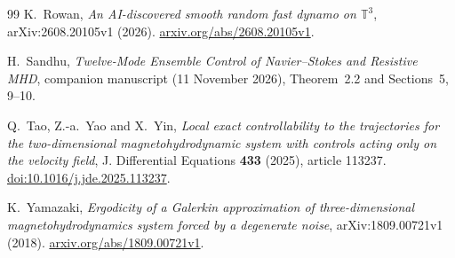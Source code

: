\documentclass[11pt,a4paper]{amsart}
\theoremstyle{definition}
\theoremstyle{remark}
\numberwithin{equation}{section}
\newcommand{\T}{\mathbb T}
\begin{document}
\begin{thebibliography}{99}
K.~Rowan,
\emph{An AI-discovered smooth random fast dynamo on $\T^3$},
arXiv:2608.20105v1 (2026).
\href{https://arxiv.org/abs/2608.20105v1}{arxiv.org/abs/2608.20105v1}.

H.~Sandhu,
\emph{Twelve-Mode Ensemble Control of Navier--Stokes and Resistive MHD},
companion manuscript (11 November 2026), Theorem~2.2 and Sections~5, 9--10.

Q.~Tao, Z.-a.~Yao and X.~Yin,
\emph{Local exact controllability to the trajectories for the two-dimensional magnetohydrodynamic system with controls acting only on the velocity field},
J. Differential Equations \textbf{433} (2025), article 113237.
\href{https://doi.org/10.1016/j.jde.2025.113237}{doi:10.1016/j.jde.2025.113237}.

K.~Yamazaki,
\emph{Ergodicity of a Galerkin approximation of three-dimensional magnetohydrodynamics system forced by a degenerate noise},
arXiv:1809.00721v1 (2018).
\href{https://arxiv.org/abs/1809.00721v1}{arxiv.org/abs/1809.00721v1}.
\end{thebibliography}
\end{document}
